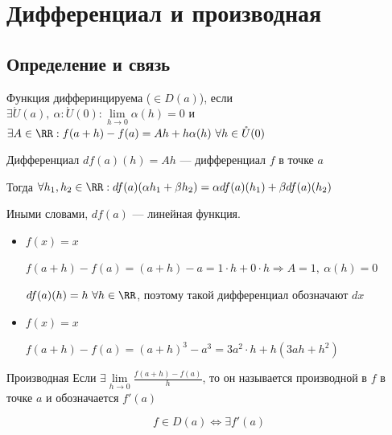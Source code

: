 \section{Дифференциал и производная}

\subsection{Определение и связь}

\begin{defn}{}{}
    Функция дифферинцируема (\( \in D(a) \)), 
    если
    \(
        \exists \mathring{U}(a), \ \alpha: \mathring{U}(0) : \lim\limits_{h \to 0} \alpha(h) = 0
    \) 
    и
    \(
        \exists A \in \RR : f(a + h) - f(a) = Ah + h \alpha(h) \ \forall h \in \mathring{U}(0)
    \)
\end{defn}

\begin{defn}{Дифференциал}{}
    \( df(a)(h) = Ah \) --- дифференциал \( f \) в точке \( a \)
\end{defn}

Тогда \( \forall h_1, h_2 \in \RR: df(a)(\alpha h_1 + \beta h_2) = \alpha df(a)(h_1) + \beta df(a)(h_2) \)

Иными словами, \( df(a) \) --- линейная функция.

\begin{example}{}{}
    \begin{itemize}
        \item
            \( f(x) = x \)

            \( f(a + h) - f(a) = (a + h) - a = 1 \cdot h + 0 \cdot h \Rightarrow A = 1, \ \alpha(h) = 0 \)

            \( df(a)(h) = h \ \forall h \in \RR \), поэтому такой дифференциал обозначают \( dx \)
        \item
            \( f(x) = x \)

            \( f(a + h) - f(a) = (a + h)^3 - a^3 = 3a^2 \cdot h + h(3ah + h^2) \)
    \end{itemize}
\end{example}

\begin{defn}{Производная}{}
    Если \( \exists \lim\limits_{h \to 0} \frac{f(a + h) - f(a)}{h} \),
    то он называется производной в \( f \) в точке \( a \) и обозначается \( f'(a) \)
\end{defn}

\begin{thrm}{}{}
    \[
        f \in D(a) \Leftrightarrow \exists f'(a)
    \]
\end{thrm}

